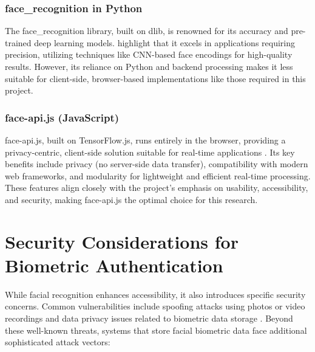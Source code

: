 \subsubsection{face\_recognition in Python}  
The face\_recognition library, built on dlib, is renowned for its accuracy and pre-trained deep learning models. \textcite{ZhangDlib2020} highlight that it excels in applications requiring precision, utilizing techniques like CNN-based face encodings for high-quality results. However, its reliance on Python and backend processing makes it less suitable for client-side, browser-based implementations like those required in this project.

\subsubsection{face-api.js (JavaScript)}
face-api.js, built on TensorFlow.js, runs entirely in the browser, providing a privacy-centric, client-side solution suitable for real-time applications \autocite{Vageele2024}. Its key benefits include privacy (no server-side data transfer), compatibility with modern web frameworks, and modularity for lightweight and efficient real-time processing. These features align closely with the project's emphasis on usability, accessibility, and security, making face-api.js the optimal choice for this research.

\section{Security Considerations for Biometric Authentication}
While facial recognition enhances accessibility, it also introduces specific security concerns. Common vulnerabilities include spoofing attacks using photos or video recordings and data privacy issues related to biometric data storage \autocite{Bowyer2006, Bahia2024}. Beyond these well-known threats, systems that store facial biometric data face additional sophisticated attack vectors:

